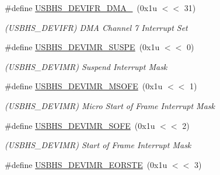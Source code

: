 \begin{DoxyCompactItemize}
\mbox{\label{group__SAMS70__USBHS_ga8e33ec37429d0441a3d46125108d437d}} 
\#define \mbox{\hyperlink{group__SAMS70__USBHS_ga8e33ec37429d0441a3d46125108d437d}{U\+S\+B\+H\+S\+\_\+\+D\+E\+V\+I\+F\+R\+\_\+\+D\+M\+A\+\_}}~(0x1u $<$$<$ 31)
\begin{DoxyCompactList}\small\item\em (U\+S\+B\+H\+S\+\_\+\+D\+E\+V\+I\+FR) D\+MA Channel 7 Interrupt Set \end{DoxyCompactList}\item 
\mbox{\label{group__SAMS70__USBHS_ga6cad62f9cbcbb886e23b1afa808ae7a9}} 
\#define \mbox{\hyperlink{group__SAMS70__USBHS_ga6cad62f9cbcbb886e23b1afa808ae7a9}{U\+S\+B\+H\+S\+\_\+\+D\+E\+V\+I\+M\+R\+\_\+\+S\+U\+S\+PE}}~(0x1u $<$$<$ 0)
\begin{DoxyCompactList}\small\item\em (U\+S\+B\+H\+S\+\_\+\+D\+E\+V\+I\+MR) Suspend Interrupt Mask \end{DoxyCompactList}\item 
\mbox{\label{group__SAMS70__USBHS_ga9b635d3a0409b1e34b2a626b3e9a422c}} 
\#define \mbox{\hyperlink{group__SAMS70__USBHS_ga9b635d3a0409b1e34b2a626b3e9a422c}{U\+S\+B\+H\+S\+\_\+\+D\+E\+V\+I\+M\+R\+\_\+\+M\+S\+O\+FE}}~(0x1u $<$$<$ 1)
\begin{DoxyCompactList}\small\item\em (U\+S\+B\+H\+S\+\_\+\+D\+E\+V\+I\+MR) Micro Start of Frame Interrupt Mask \end{DoxyCompactList}\item 
\mbox{\label{group__SAMS70__USBHS_gac6fac3da3ab8b9b63dec5a96dbcec2e8}} 
\#define \mbox{\hyperlink{group__SAMS70__USBHS_gac6fac3da3ab8b9b63dec5a96dbcec2e8}{U\+S\+B\+H\+S\+\_\+\+D\+E\+V\+I\+M\+R\+\_\+\+S\+O\+FE}}~(0x1u $<$$<$ 2)
\begin{DoxyCompactList}\small\item\em (U\+S\+B\+H\+S\+\_\+\+D\+E\+V\+I\+MR) Start of Frame Interrupt Mask \end{DoxyCompactList}\item 
\mbox{\label{group__SAMS70__USBHS_gad86797cc93ab56e2445a55f4d769eaa1}} 
\#define \mbox{\hyperlink{group__SAMS70__USBHS_gad86797cc93ab56e2445a55f4d769eaa1}{U\+S\+B\+H\+S\+\_\+\+D\+E\+V\+I\+M\+R\+\_\+\+E\+O\+R\+S\+TE}}~(0x1u $<$$<$ 3)
$$
\end{DoxyCompactItemize}
